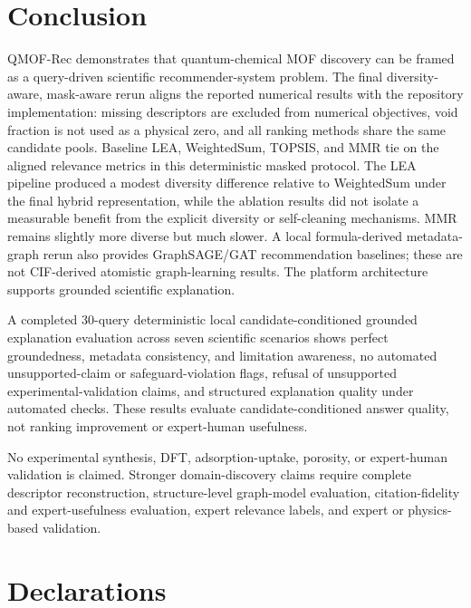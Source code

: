 \documentclass[12pt,a4paper]{article}
\begin{document}
\section{Conclusion}
\label{sec:conclusion}

QMOF-Rec demonstrates that quantum-chemical MOF discovery can be framed as a query-driven scientific recommender-system problem. The final diversity-aware, mask-aware rerun aligns the reported numerical results with the repository implementation: missing descriptors are excluded from numerical objectives, void fraction is not used as a physical zero, and all ranking methods share the same candidate pools. Baseline LEA, WeightedSum, TOPSIS, and MMR tie on the aligned relevance metrics in this deterministic masked protocol. The LEA pipeline produced a modest diversity difference relative to WeightedSum under the final hybrid representation, while the ablation results did not isolate a measurable benefit from the explicit diversity or self-cleaning mechanisms. MMR remains slightly more diverse but much slower. A local formula-derived metadata-graph rerun also provides GraphSAGE/GAT recommendation baselines; these are not CIF-derived atomistic graph-learning results. The platform architecture supports grounded scientific explanation.

A completed 30-query deterministic local candidate-conditioned grounded explanation evaluation across seven scientific scenarios shows perfect groundedness, metadata consistency, and limitation awareness, no automated unsupported-claim or safeguard-violation flags, refusal of unsupported experimental-validation claims, and structured explanation quality under automated checks. These results evaluate candidate-conditioned answer quality, not ranking improvement or expert-human usefulness.

No experimental synthesis, DFT, adsorption-uptake, porosity, or expert-human validation is claimed. Stronger domain-discovery claims require complete descriptor reconstruction, structure-level graph-model evaluation, citation-fidelity and expert-usefulness evaluation, expert relevance labels, and expert or physics-based validation.

\section*{Declarations}
\end{document}
